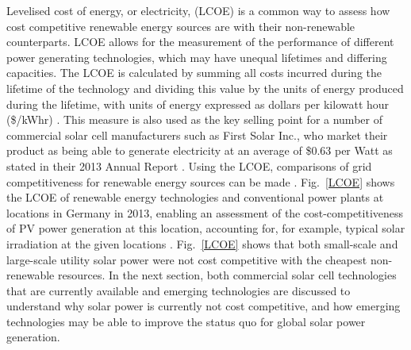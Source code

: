 \documentclass[11pt, twoside]{report}
\begin{document}
Levelised cost of energy, or electricity, (LCOE) is a common way to assess how cost competitive renewable energy sources are with their non-renewable counterparts. LCOE allows for the measurement of the performance of different power generating technologies, which may have unequal lifetimes and differing capacities. The LCOE is calculated by summing all costs incurred during the lifetime of the technology and dividing this value by the units of energy produced during the lifetime, with units of energy expressed as dollars per kilowatt hour (\$/kWhr) \cite{LCOE2}. This measure is also used as the key selling point for a number of commercial solar cell manufacturers such as First Solar Inc., who market their product as being able to generate electricity at an average of \$0.63 per Watt as stated in their 2013  Annual Report \cite{first_solar}. Using the LCOE, comparisons of grid competitiveness for renewable energy sources can be made \cite{LCOE2}. Fig.~\ref{LCOE} shows the LCOE of renewable energy technologies and conventional power plants at locations in Germany in 2013, enabling an assessment of the cost-competitiveness of PV power generation at this location, accounting for, for example, typical solar irradiation at the given locations \cite{LCOE}. Fig.~\ref{LCOE} shows that both small-scale and large-scale utility solar power were not cost competitive with the cheapest non-renewable resources. In the next section, both commercial solar cell technologies that are currently available and emerging technologies are discussed to understand why solar power is currently not cost competitive, and how emerging technologies may be able to improve the status quo for global solar power generation.


\end{document}

